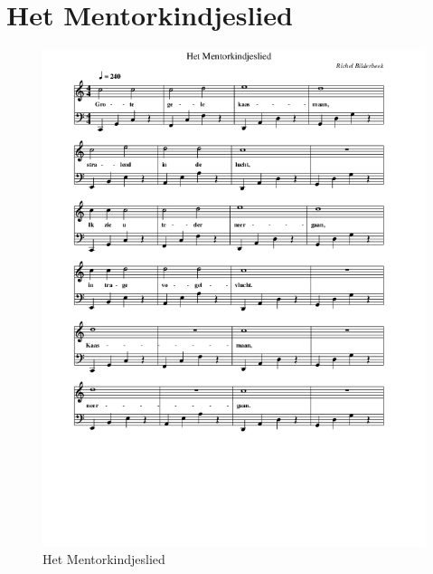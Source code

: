 \section{Het Mentorkindjeslied}



\begin{figure}[!htbp]
  \includegraphics[width=\textwidth,height=\textheight,keepaspectratio]{../songs/16_het_mentorkindjeslied.png}
  \caption{Het Mentorkindjeslied}
  \label{fig:16_het_mentorkindjeslied}
\end{figure}
